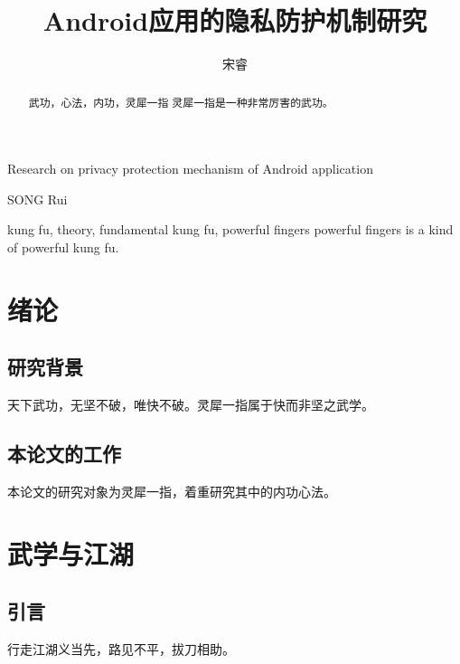 \documentclass[algorithmlist, figurelist,tablelist, nomlist,masters]{seuthesix}
\begin{document}
\title{Android应用的隐私防护机制研究}{}{Research on privacy protection mechanism of Android application}{}
\author{宋睿}{SONG Rui}
\submajor{}
\authorizedate{\today}
\committeechair{}
\reviewer{}{}



\makebigcover
\makecover



\begin{abstract}{武功，心法，内功，灵犀一指}
灵犀一指是一种非常厉害的武功。
\end{abstract}



\begin{englishabstract}{kung fu, theory, fundamental kung fu, powerful fingers}
 powerful fingers is a kind of powerful kung fu.
\end{englishabstract}



\tableofcontents
\listofothers

\mainmatter

\chapter{绪论}
\section{研究背景}
天下武功，无坚不破，唯快不破。灵犀一指属于快而非坚之武学。


\section{本论文的工作}
本论文的研究对象为灵犀一指，着重研究其中的内功心法。



\chapter{武学与江湖}

\section{引言}
行走江湖义当先，路见不平，拔刀相助。
\end{document}
